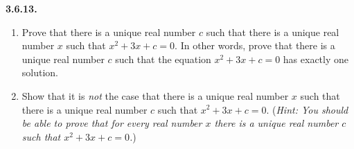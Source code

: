 \documentclass[12pt]{amsart}
\newenvironment{statement}[1]{\smallskip\noindent\color[rgb]{.6627, .3529, .6314} {\bf #1.}}{}
\theoremstyle{definition}
\theoremstyle{remark}
\begin{document}
\begin{statement}{3.6.13}
\begin{enumerate}
	\item Prove that there is a unique real number $c$ such that there is a unique real number $x$
	such that $x^2 + 3x + c = 0$.
	In other words, prove that there is a unique real number $c$ such that the equation
	$x^2 + 3x + c = 0$ has exactly one solution.
	
	\item Show that it is \emph{not} the case that there is a unique real number $x$ such that there is
	a unique real number $c$ such that $x^2 + 3x + c = 0$.
	(\emph{Hint: You should be able to prove that for \emph{every} real number $x$ there is a unique
	real number $c$ such that $x^2 + 3x + c = 0$.})
\end{enumerate}
\end{statement}
\end{document}

